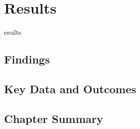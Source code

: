 \chapter{Results}\label{ch05}

esults



\section{Findings}


\section{Key Data and Outcomes}


\section{Chapter Summary}
